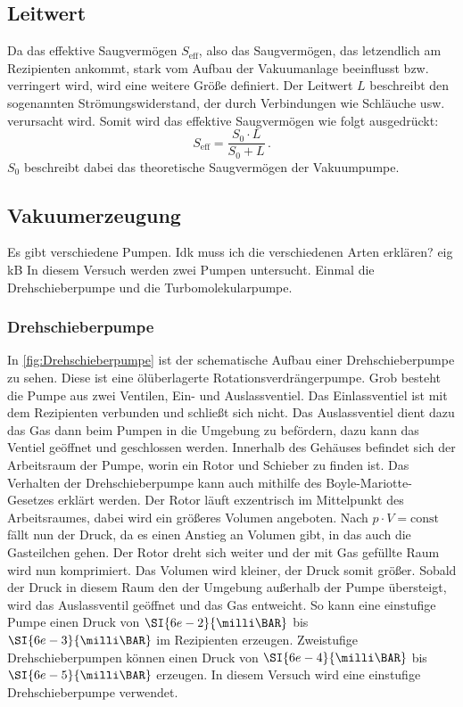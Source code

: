         \subsection{Leitwert}
            Da das effektive Saugvermögen $S_\text{eff}$, also das Saugvermögen, das letzendlich am Rezipienten ankommt, stark vom Aufbau der Vakuumanlage beeinflusst bzw. verringert wird, wird eine weitere Größe definiert.
            Der Leitwert $L$ beschreibt den sogenannten Strömungswiderstand, der durch Verbindungen wie Schläuche usw. verursacht wird.
            Somit wird das effektive Saugvermögen wie folgt ausgedrückt:
            \begin{equation*}
                S_\text{eff} = \frac{S_0 \cdot L}{S_0 + L} \, .
            \end{equation*}
            $S_0$ beschreibt dabei das theoretische Saugvermögen der Vakuumpumpe.


    \subsection{Vakuumerzeugung}
        Es gibt verschiedene Pumpen. Idk muss ich die verschiedenen Arten erklären? eig kB
        In diesem Versuch werden zwei Pumpen untersucht.
        Einmal die Drehschieberpumpe und die Turbomolekularpumpe.

        \subsubsection{Drehschieberpumpe}
            In \autoref{fig:Drehschieberpumpe} ist der schematische Aufbau einer Drehschieberpumpe zu sehen.
            Diese ist eine ölüberlagerte Rotationsverdrängerpumpe.
            Grob besteht die Pumpe aus zwei Ventilen, Ein- und Auslassventiel.
            Das Einlassventiel ist mit dem Rezipienten verbunden und schließt sich nicht.
            Das Auslassventiel dient dazu das Gas dann beim Pumpen in die Umgebung zu befördern, dazu kann das Ventiel geöffnet und geschlossen werden.
            Innerhalb des Gehäuses befindet sich der Arbeitsraum der Pumpe, worin ein Rotor und Schieber zu finden ist.
            Das Verhalten der Drehschieberpumpe kann auch mithilfe des Boyle-Mariotte-Gesetzes erklärt werden.
            Der Rotor läuft exzentrisch im Mittelpunkt des Arbeitsraumes, dabei wird ein größeres Volumen angeboten.
            Nach $p \cdot V = \text{const}$ fällt nun der Druck, da es einen Anstieg an Volumen gibt, in das auch die Gasteilchen gehen.
            Der Rotor dreht sich weiter und der mit Gas gefüllte Raum wird nun komprimiert.
            Das Volumen wird kleiner, der Druck somit größer.
            Sobald der Druck in diesem Raum den der Umgebung außerhalb der Pumpe übersteigt, wird das Auslassventil geöffnet und das Gas entweicht.
            So kann eine einstufige Pumpe einen Druck von $\SI{6e-2}{\milli\BAR}$ bis $\SI{6e-3}{\milli\BAR}$ im Rezipienten erzeugen.
            Zweistufige Drehschieberpumpen können einen Druck von $\SI{6e-4}{\milli\BAR}$ bis $\SI{6e-5}{\milli\BAR}$ erzeugen.
            In diesem Versuch wird eine einstufige Drehschieberpumpe verwendet.
      
